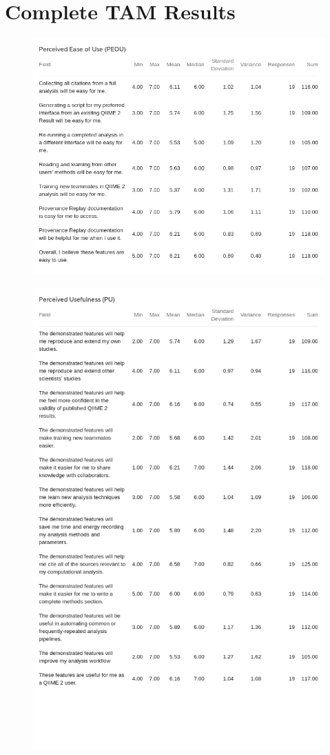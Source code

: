\chapter{Complete TAM Results}
\label{app:TAM}

\begin{figure}[htp]
\centering
\includegraphics[width=\textwidth]{figures/PEOU_table.jpg}
\end{figure}

\begin{figure}[htp]
\centering
\includegraphics[width=\textwidth]{figures/PU_table.jpg}
\end{figure}